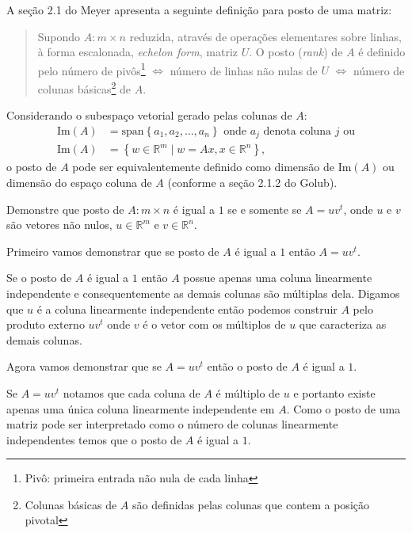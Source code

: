 \begin{questions}
     A se\c{c}\~{a}o 2.1 do Meyer\nocite{Meyer:2000:matrix} apresenta a seguinte defini\c{c}\~{a}o para posto de uma matriz:
    \begin{quote}
        Supondo $A : m \times n$ reduzida, atrav\'{e}s de opera\c{c}\~{o}es elementares sobre linhas, \`{a} forma escalonada, \textit{echelon form}, matriz $U$. O posto (\textit{rank}) de $A$ \'{e} definido pelo n\'{u}mero de piv\^{o}s\footnote{Piv\^{o}: primeira entrada n\~{a}o nula de cada linha} $\Leftrightarrow$ n\'{u}mero de linhas n\~{a}o nulas de $U$ $\Leftrightarrow$ n\'{u}mero de colunas b\'{a}sicas\footnote{Colunas b\'{a}sicas de $A$ s\~{a}o definidas pelas colunas que contem a posi\c{c}\~{a}o pivotal} de $A$.
    \end{quote}

    Considerando o subespa\c{c}o vetorial gerado pelas colunas de $A$:
    \begin{align*}
        \mbox{Im} (A) &= \mbox{span} \left\{ a_1, a_2, \ldots, a_n \right\} \mbox{ onde $a_j$ denota coluna $j$ ou} \\
        \mbox{Im} (A) &= \left\{ w \in \mathbb{R}^m \mid w = A x, x \in \mathbb{R}^n \right\},
    \end{align*}
    o posto de $A$ pode ser equivalentemente definido como dimens\~{a}o de $\mbox{Im} (A)$ ou dimens\~{a}o do espa\c{c}o coluna de $A$ (conforme a se\c{c}\~{a}o 2.1.2 do Golub\nocite{Golub:1996:matrix}).

     Demonstre que posto de $A : m \times n$ \'{e} igual a $1$ se e somente se $A = u v^t$, onde $u$ e $v$ s\~{a}o vetores n\~{a}o nulos, $u \in \mathbb{R}^m$ e $v \in \mathbb{R}^n$.
    \begin{solution}
        Primeiro vamos demonstrar que se posto de $A$ \'{e} igual a $1$ ent\~{a}o $A = u v^t$.
        
        Se o posto de $A$ \'{e} igual a $1$ ent\~{a}o $A$ possue apenas uma coluna linearmente independente e consequentemente as demais colunas s\~{a}o m\'{u}ltiplas dela. Digamos que $u$ \'{e} a coluna linearmente independente ent\~{a}o podemos construir $A$ pelo produto externo $u v^t$ onde $v$ \'{e} o vetor com os m\'{u}ltiplos de $u$ que caracteriza as demais colunas.

        Agora vamos demonstrar que se $A = u v^t$ ent\~{a}o o posto de $A$ \'{e} igual a $1$. 

        Se $A = u v^t$ notamos que cada coluna de $A$ \'{e} m\'{u}ltiplo de $u$ e portanto existe apenas uma \'{u}nica coluna linearmente independente em $A$. Como o posto de uma matriz pode ser interpretado como o n\'{u}mero de colunas linearmente independentes temos que o posto de $A$ \'{e} igual a $1$.
    \end{solution}


\end{questions}
